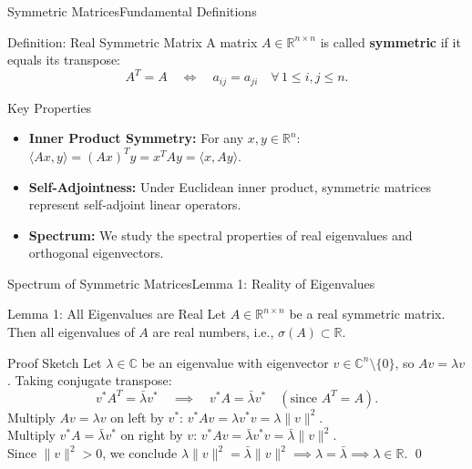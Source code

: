 \documentclass[10pt, aspectratio=169]{beamer}
\newcommand{\hl}[1]{{\color{amber}\textbf{#1}}}
\begin{document}
\begin{frame}{Symmetric Matrices}{Fundamental Definitions}
  \begin{mathdef}{Definition: Real Symmetric Matrix}
    A matrix $A \in \mathbb{R}^{n \times n}$ is called \hl{symmetric} if it equals its transpose:
    \[
      A^T = A \quad \Longleftrightarrow \quad a_{ij} = a_{ji} \quad \forall \, 1 \le i, j \le n.
    \]
  \end{mathdef}

  \begin{conceptbox}{Key Properties}
    \small
    \begin{itemize}
      \setlength{\itemsep}{2pt}
      \item \textbf{Inner Product Symmetry:} For any $x, y \in \mathbb{R}^n$: $\langle Ax, y \rangle = (Ax)^T y = x^T A y = \langle x, Ay \rangle$.
      \item \textbf{Self-Adjointness:} Under Euclidean inner product, symmetric matrices represent self-adjoint linear operators.
      \item \textbf{Spectrum:} We study the spectral properties of real eigenvalues and orthogonal eigenvectors.
    \end{itemize}
  \end{conceptbox}
\end{frame}

\begin{frame}{Spectrum of Symmetric Matrices}{Lemma 1: Reality of Eigenvalues}
  \begin{maththeorem}{Lemma 1: All Eigenvalues are Real}
    Let $A \in \mathbb{R}^{n \times n}$ be a real symmetric matrix. Then all eigenvalues of $A$ are real numbers, i.e., $\sigma(A) \subset \mathbb{R}$.
  \end{maththeorem}

  \vspace*{0.1cm}

  \begin{conceptbox}{Proof Sketch}
    \small
    Let $\lambda \in \mathbb{C}$ be an eigenvalue with eigenvector $v \in \mathbb{C}^n \setminus \{0\}$, so $Av = \lambda v$.
    Taking conjugate transpose:
    \[
      v^* A^T = \bar{\lambda} v^* \quad \implies \quad v^* A = \bar{\lambda} v^* \quad (\text{since } A^T = A).
    \]
    Multiply $Av = \lambda v$ on left by $v^*$: $v^* A v = \lambda v^* v = \lambda \|v\|^2$. \\[2pt]
    Multiply $v^* A = \bar{\lambda} v^*$ on right by $v$: $v^* A v = \bar{\lambda} v^* v = \bar{\lambda} \|v\|^2$. \\[2pt]
    Since $\|v\|^2 > 0$, we conclude $\lambda \|v\|^2 = \bar{\lambda} \|v\|^2 \implies \lambda = \bar{\lambda} \implies \lambda \in \mathbb{R}$. \qed
  \end{conceptbox}
\end{frame}
\end{document}

